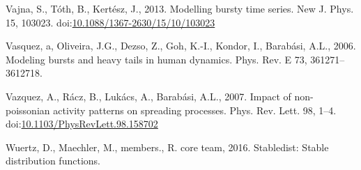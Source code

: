 \documentclass[]{elsarticle} %
\begin{document}
\leavevmode\hypertarget{ref-Vajna2013}{}%
Vajna, S., Tóth, B., Kertész, J., 2013. Modelling bursty time series.
New J. Phys. 15, 103023.
doi:\href{https://doi.org/10.1088/1367-2630/15/10/103023}{10.1088/1367-2630/15/10/103023}

\leavevmode\hypertarget{ref-Vasquez2006}{}%
Vasquez, a, Oliveira, J.G., Dezso, Z., Goh, K.-I., Kondor, I., Barabási,
A.L., 2006. Modeling bursts and heavy tails in human dynamics. Phys.
Rev. E 73, 361271--3612718.

\leavevmode\hypertarget{ref-Vazquez2007}{}%
Vazquez, A., Rácz, B., Lukács, A., Barabási, A.L., 2007. Impact of
non-poissonian activity patterns on spreading processes. Phys. Rev.
Lett. 98, 1--4.
doi:\href{https://doi.org/10.1103/PhysRevLett.98.158702}{10.1103/PhysRevLett.98.158702}

\leavevmode\hypertarget{ref-stabledist}{}%
Wuertz, D., Maechler, M., members., R. core team, 2016. Stabledist:
Stable distribution functions.
\end{document}
